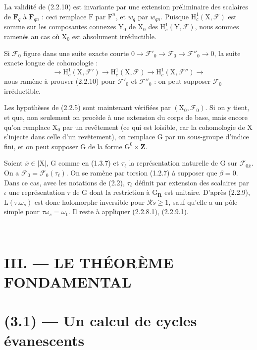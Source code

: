 \documentclass[11pt,leqno]{article}
\newcommand{\Page}[1]{\ifvmode\noindent\else\unskip\ \fi{\footnotesize\textcolor{gray}{[p.\,#1]}}\ \ignorespaces}
\begin{document}
La validité de (2.2.10) est invariante par une extension préliminaire des scalaires de \(\mathbf F_q\) à \(\mathbf F_{qn}\) : ceci remplace \(\mathrm F\) par \(\mathrm F^n\), et \(w_q\) par \(w_{qn}\). Puisque \(\mathrm H_c^1(\mathrm X,\mathscr F)\) est somme sur les composantes connexes \(\mathrm Y_0\) de \(\mathrm X_0\) des \(\mathrm H_c^1(\mathrm Y,\mathscr F)\), nous sommes ramenés au cas où \(\mathrm X_0\) est absolument irréductible.

Si \(\mathscr F_0\) figure dans une suite exacte courte \(0\to\mathscr F'_0\to\mathscr F_0\to\mathscr F''_0\to0\), la suite exacte longue de cohomologie :
\[
\to\mathrm H_c^1(\mathrm X,\mathscr F')
\to\mathrm H_c^1(\mathrm X,\mathscr F)
\to\mathrm H_c^1(\mathrm X,\mathscr F'')\to
\]
nous ramène à prouver (2.2.10) pour \(\mathscr F'_0\) et \(\mathscr F''_0\) : on peut supposer \(\mathscr F_0\) irréductible.

Les hypothèses de (2.2.5) sont maintenant vérifiées par \((\mathrm X_0,\mathscr F_0)\). Si on y tient, et que, non seulement on procède à une extension du corps de base, mais encore qu’on remplace \(\mathrm X_0\) par un revêtement (ce qui est loisible, car la cohomologie de \(\mathrm X\) s’injecte dans celle d’un revêtement), on remplace \(\mathrm G\) par un sous-groupe d’indice fini, et on peut supposer \(\mathrm G\) de la forme \(\mathrm G^0\times\mathbf Z\).

Soient \(\bar{x}\in|\mathrm X|\), \(\mathrm G\) comme en (1.3.7) et \(\tau_\ell\) la représentation naturelle de \(\mathrm G\) sur \(\mathscr F_{0\bar{x}}\). On a \(\mathscr F_0=\mathscr F_0(\tau_\ell)\). On se ramène par torsion (1.2.7) à supposer que \(\beta=0\). Dans ce cas, avec les notations de (2.2), \(\tau_\ell\) définit par extension des scalaires par \(\iota\) une représentation \(\tau\) de \(\mathrm G\) dont la restriction à \(\mathrm G_{\mathbf R}\) est unitaire. D’après (2.2.9), \(\mathrm L(\tau.\omega_s)\) est donc holomorphe inversible pour \(\mathscr R s\geq1\), sauf qu’elle a un pôle simple pour \(\tau\omega_s=\omega_1\). Il reste à appliquer (2.2.8.1), (2.2.9.1).

\Page{197}

\section*{III. — LE THÉORÈME FONDAMENTAL}

\section*{(3.1) — Un calcul de cycles évanescents}
\end{document}
